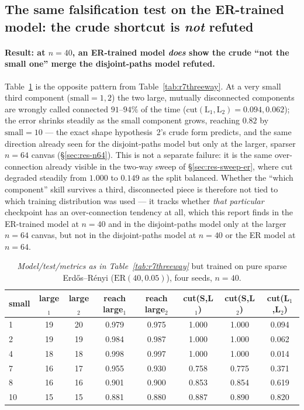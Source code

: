 \documentclass[11pt,a4paper]{article}
\begin{document}
\subsection{The same falsification test on the ER-trained model: the crude shortcut is \emph{not} refuted}
\label{sec:res-threeway-er}

\paragraph{Result: at $n=40$, an ER-trained model \emph{does} show the crude ``not the small
one'' merge the disjoint-paths model refuted.} Table~\ref{tab:r7threeway-er} is the opposite
pattern from Table~\ref{tab:r7threeway}. At a very small third component ($\mathrm{small}=1,2$)
the two large, mutually disconnected components are wrongly called connected $91$--$94\%$ of
the time ($\mathrm{cut}(\mathrm{L}_1,\mathrm{L}_2)=0.094,0.062$); the error shrinks steadily
as the small component grows, reaching $0.82$ by $\mathrm{small}=10$ --- the exact shape
hypothesis~2's crude form predicts, and the same direction already seen for the
disjoint-paths model but only at the larger, sparser $n=64$ canvas (\S\ref{sec:res-n64}).
This is not a separate failure: it is the same over-connection already visible in the
two-way sweep of \S\ref{sec:res-sweep-er}, where cut degraded steadily from $1.000$ to
$0.149$ as the split balanced. Whether the ``which component'' skill survives a third,
disconnected piece is therefore not tied to which training distribution was used --- it
tracks whether \emph{that particular} checkpoint has an over-connection tendency at all, which
this report finds in the ER-trained model at $n=40$ and in the disjoint-paths model only at
the larger $n=64$ canvas, but not in the disjoint-paths model at $n=40$ or the ER model at
$n=64$.

\begin{table}[H]\centering\small
\begin{tabular}{lccccccc}
\toprule
small & large$_1$ & large$_2$ & reach large$_1$ & reach large$_2$ & cut(S,L$_1$) & cut(S,L$_2$) & cut(L$_1$,L$_2$)\\
\midrule
1  & 19 & 20 & 0.979 & 0.975 & 1.000 & 1.000 & 0.094\\
2  & 19 & 19 & 0.984 & 0.987 & 1.000 & 1.000 & 0.062\\
4  & 18 & 18 & 0.998 & 0.997 & 1.000 & 1.000 & 0.014\\
7  & 16 & 17 & 0.955 & 0.930 & 0.758 & 0.775 & 0.371\\
8  & 16 & 16 & 0.901 & 0.900 & 0.853 & 0.854 & 0.619\\
10 & 15 & 15 & 0.881 & 0.880 & 0.887 & 0.890 & 0.820\\
\bottomrule\end{tabular}
\caption{\emph{Model/test/metrics as in Table~\ref{tab:r7threeway}} but trained on pure
sparse Erd\H{o}s--R\'enyi ($\mathrm{ER}(40,0.05)$), four seeds, $n=40$.}
\label{tab:r7threeway-er}
\end{table}
\end{document}
